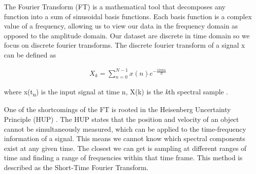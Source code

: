 \documentclass{turabian-thesis}
\begin{document}

The Fourier Transform (FT) is a mathematical tool that decomposes any function into a sum of sinusoidal basis functions. Each basis function is a complex value of a frequency, allowing us to view our data in the frequency domain as opposed to the amplitude domain. Our dataset are discrete in time domain so we focus on discrete fourier transforms. The discrete fourier transform of a signal x can be defined as 

\begin{equation} \label{eq1}
   \begin{split}
      X_{k} =  \sum_{n=0}^{N-1} x(n) e^{-\frac{i2\pi kn}{N}}
   \end{split}
\end{equation}

where x(t\textsubscript{n}) is the input signal at time n, X(k) is the \textit{k}th spectral sample \cite{smith_mathematics_nodate}.



One of the shortcomings of the FT is rooted in the Heisenberg Uncertainty Principle (HUP) \cite{hill_uncertainty_nodate}.  The HUP states that the position and velocity of an object cannot be simultaneously measured, which can be applied to the time-frequency information of a signal. This means we cannot know which spectral components exist at any given time. The closest we can get is sampling at different ranges of time and finding a range of frequencies within that time frame. This method is described as the Short-Time Fourier Transform.




\end{document}

